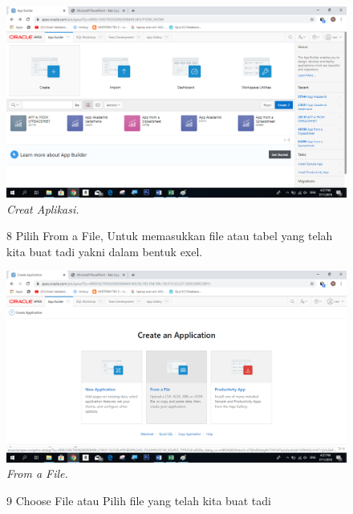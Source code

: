 \begin{enumerate}
\begin{figure}
    \begin{center}
    \includegraphics[scale=0.6]{figures/7.png}
    \caption{\textit{Creat Aplikasi.}}
    \end{center}
    \label{gambar}
    \end{figure}

\begin{figure}
\item[8]Pilih From a File, Untuk memasukkan file atau tabel yang telah kita buat tadi yakni dalam bentuk exel.

    \begin{center}
    \includegraphics[scale=0.4]{figures/8.png}
    \caption{\textit{From a File.}}
    \end{center}
    \label{gambar}
    \end{figure}

\begin{figure}
\item[9]Choose File atau Pilih file yang telah kita buat tadi


\end{figure}
\end{enumerate}
